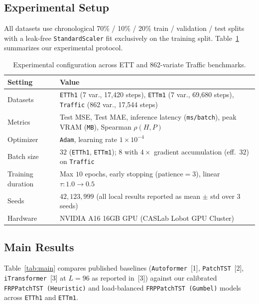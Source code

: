 \documentclass[11pt, letterpaper]{article}
\begin{document}
\subsection{Experimental Setup}
All datasets use chronological 70\% / 10\% / 20\% train / validation / test splits with a leak-free \texttt{StandardScaler} fit exclusively on the training split. Table~\ref{tab:setup} summarizes our experimental protocol.

\begin{table}[h]
\centering
\small
\begin{tabular}{lp{}}
\toprule
\textbf{Setting} & \textbf{Value} \\
\midrule
Datasets & \texttt{ETTh1} (7 var., 17,420 steps), \texttt{ETTm1} (7 var., 69,680 steps), \texttt{Traffic} (862 var., 17,544 steps) \\
Metrics & Test MSE, Test MAE, inference latency (\texttt{ms/batch}), peak VRAM (\texttt{MB}), Spearman $\rho(H, P)$ \\
Optimizer & \texttt{Adam}, learning rate $1\times 10^{-4}$ \\
Batch size & $32$ (\texttt{ETTh1}, \texttt{ETTm1}); $8$ with $4\times$ gradient accumulation (eff.\ $32$) on \texttt{Traffic} \\
Training duration & Max $10$ epochs, early stopping ($\mathrm{patience}=3$), linear $\tau: 1.0 \to 0.5$ \\
Seeds & $42, 123, 999$ (all local results reported as mean $\pm$ std over 3 seeds) \\
Hardware & NVIDIA A16 16GB GPU (CASLab Lobot GPU Cluster) \\
\bottomrule
\end{tabular}
\caption{Experimental configuration across ETT and 862-variate Traffic benchmarks.}
\label{tab:setup}
\end{table}

\subsection{Main Results}
Table~\ref{tab:main} compares published baselines (\texttt{Autoformer}~[1], \texttt{PatchTST}~[2], \texttt{iTransformer}~[3] at $L=96$ as reported in~[3]) against our calibrated \texttt{FRPPatchTST (Heuristic)} and load-balanced \texttt{FRPPatchTST (Gumbel)} models across \texttt{ETTh1} and \texttt{ETTm1}.
\end{document}
